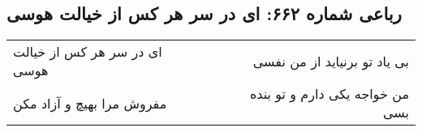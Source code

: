 \begin{center}
\section*{رباعی شماره ۶۶۲: ای در سر هر کس از خیالت هوسی}
\label{sec:sh662}
\begin{longtable}{l p{0.5cm} r}
ای در سر هر کس از خیالت هوسی
&&
بی یاد تو برنیاید از من نفسی
\\
مفروش مرا بهیچ و آزاد مکن
&&
من خواجه یکی دارم و تو بنده بسی
\\
\end{longtable}
\end{center}
